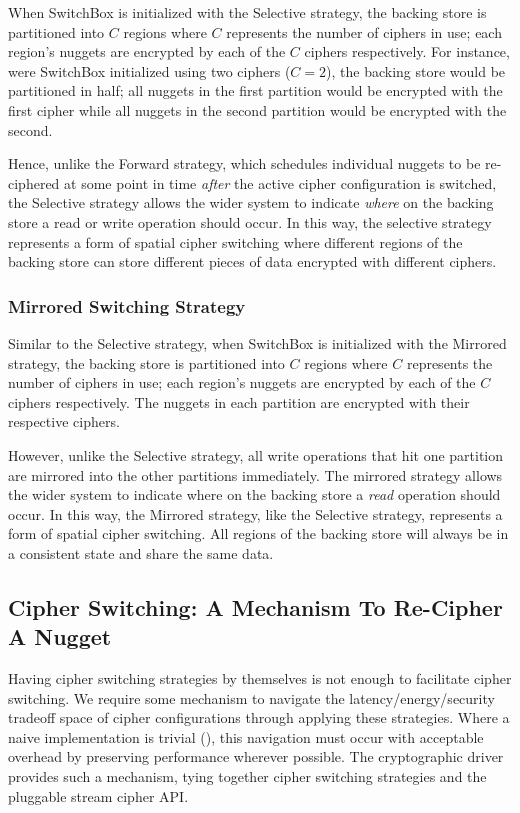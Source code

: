 When SwitchBox is initialized with the Selective strategy, the backing store is
partitioned into $C$ regions where $C$ represents the number of ciphers in use;
each region's nuggets are encrypted by each of the $C$ ciphers respectively. For
instance, were SwitchBox initialized using two ciphers ($C = 2$), the backing
store would be partitioned in half; all nuggets in the first partition would be
encrypted with the first cipher while all nuggets in the second partition would
be encrypted with the second.

Hence, unlike the Forward strategy, which schedules individual nuggets to be
re-ciphered at some point in time \emph{after} the active cipher configuration
is switched, the Selective strategy allows the wider system to indicate
\emph{where} on the backing store a read or write operation should occur. In
this way, the selective strategy represents a form of spatial cipher switching
where different regions of the backing store can store different pieces of data
encrypted with different ciphers.

\subsubsection{Mirrored Switching Strategy}

Similar to the Selective strategy, when SwitchBox is initialized with the
Mirrored strategy, the backing store is partitioned into $C$ regions where $C$
represents the number of ciphers in use; each region's nuggets are encrypted by
each of the $C$ ciphers respectively. The nuggets in each partition are
encrypted with their respective ciphers.

However, unlike the Selective strategy, all write operations that hit one
partition are mirrored into the other partitions immediately. The mirrored
strategy allows the wider system to indicate where on the backing store a
\emph{read} operation should occur. In this way, the Mirrored strategy, like the
Selective strategy, represents a form of spatial cipher switching. All regions
of the backing store will always be in a consistent state and share the same
data.

\subsection{Cipher Switching: A Mechanism To Re-Cipher A Nugget}

Having cipher switching strategies by themselves is not enough to facilitate
cipher switching. We require some mechanism to navigate the
latency/energy/security tradeoff space of cipher configurations through applying
these strategies. Where a naive implementation is trivial (), this navigation must occur with
acceptable overhead by preserving performance wherever possible. The
cryptographic driver provides such a mechanism, tying together cipher switching
strategies and the pluggable stream cipher API.

